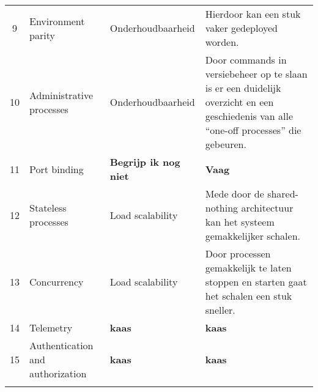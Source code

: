 \begin{longtable}[c]{c p{3cm} p{3.5cm} p{5.5cm}}
	9 & Environment parity & Onderhoudbaarheid & Hierdoor kan een stuk vaker gedeployed worden. \\
	10 & Administrative processes & Onderhoudbaarheid & Door commands in versiebeheer op te slaan is er een duidelijk overzicht en een geschiedenis van alle \enquote{one-off processes} die gebeuren. \\
	11 & Port binding & \textbf{Begrijp ik nog niet} & \textbf{Vaag} \\
	12 & Stateless processes & Load scalability & Mede door de shared-nothing architectuur kan het systeem gemakkelijker schalen. \\
	13 & Concurrency & Load scalability & Door processen gemakkelijk te laten stoppen en starten gaat het schalen een stuk sneller. \\
	14 & Telemetry & \textbf{kaas} & \textbf{kaas} \\
	15 & Authentication and authorization & \textbf{kaas} & \textbf{kaas} \\
	\bottomrule\\
\end{longtable}

\label{Bijlagek6}